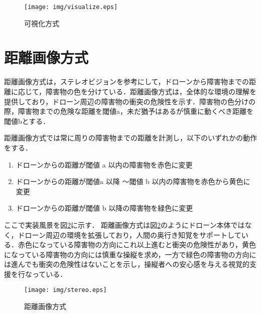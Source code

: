 \documentclass
[a4paper,11pt]{jreport}
\begin{document}
\begin{figure}[bt]
	\begin{center}
    \texttt{[image: img/visualize.eps]}
    \caption{可視化方式}
    \label{tab:visualize}
    \end{center}
\end{figure}

\newpage
\section{距離画像方式}
距離画像方式は，ステレオビジョンを参考にして，ドローンから障害物までの距離に応じて，障害物の色を分けている．距離画像方式は，全体的な環境の理解を提供しており，ドローン周辺の障害物の衝突の危険性を示す．障害物の色分けの際，障害物までの危険な距離を閾値a，未だ猶予はあるが慎重に動くべき距離を閾値bとする．
\par
距離画像方式では常に周りの障害物までの距離を計測し，以下のいずれかの動作をする．

\begin{enumerate}
	\item ドローンからの距離が閾値 a 以内の障害物を赤色に変更
    
    \item ドローンからの距離が閾値a 以降 〜閾値 b 以内の障害物を赤色から黄色に変更
    
    \item ドローンからの距離が閾値 b 以降の障害物を緑色に変更
\end{enumerate}
ここで実装風景を図\ref{tab:stereo}に示す．
距離画像方式は図\ref{tab:stereo}のようにドローン本体ではなく，ドローン周辺の環境を拡張しており，人間の奥行き知覚をサポートしている．赤色になっている障害物の方向にこれ以上進むと衝突の危険性があり，黄色になっている障害物の方向には慎重な操縦を求め，一方で緑色の障害物の方向には進んでも衝突の危険性はないことを示し，操縦者への安心感を与える視覚的支援を行なっている．


\begin{figure}[bt]
	\begin{center}
    \texttt{[image: img/stereo.eps]}
    \caption{距離画像方式}
    \label{tab:stereo}
    \end{center}
\end{figure}

\clearpage
\end{document}
